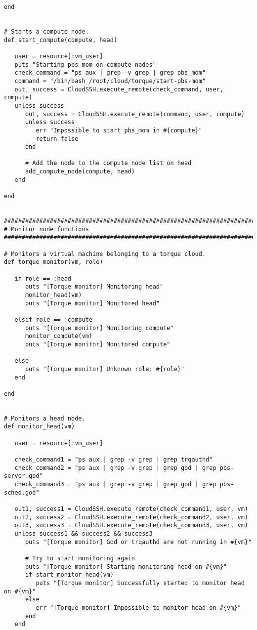 \begin{lstlisting}
end


# Starts a compute node.
def start_compute(compute, head)

   user = resource[:vm_user]
   puts "Starting pbs_mom on compute nodes"
   check_command = "ps aux | grep -v grep | grep pbs_mom"
   command = "/bin/bash /root/cloud/torque/start-pbs-mom"
   out, success = CloudSSH.execute_remote(check_command, user, compute)
   unless success
      out, success = CloudSSH.execute_remote(command, user, compute)
      unless success
         err "Impossible to start pbs_mom in #{compute}"
         return false
      end
      
      # Add the node to the compute node list on head
      add_compute_node(compute, head)
   end

end


################################################################################
# Monitor node functions
################################################################################

# Monitors a virtual machine belonging to a torque cloud.
def torque_monitor(vm, role)

   if role == :head
      puts "[Torque monitor] Monitoring head"
      monitor_head(vm)
      puts "[Torque monitor] Monitored head"

   elsif role == :compute
      puts "[Torque monitor] Monitoring compute"
      monitor_compute(vm)
      puts "[Torque monitor] Monitored compute"

   else
      puts "[Torque monitor] Unknown role: #{role}"
   end
   
end


# Monitors a head node.
def monitor_head(vm)

   user = resource[:vm_user]

   check_command1 = "ps aux | grep -v grep | grep trqauthd"
   check_command2 = "ps aux | grep -v grep | grep god | grep pbs-server.god"
   check_command3 = "ps aux | grep -v grep | grep god | grep pbs-sched.god"
   
   out1, success1 = CloudSSH.execute_remote(check_command1, user, vm)
   out2, success2 = CloudSSH.execute_remote(check_command2, user, vm)
   out3, success3 = CloudSSH.execute_remote(check_command3, user, vm)
   unless success1 && success2 && success3
      puts "[Torque monitor] God or trqauthd are not running in #{vm}"
      
      # Try to start monitoring again
      puts "[Torque monitor] Starting monitoring head on #{vm}"
      if start_monitor_head(vm)
         puts "[Torque monitor] Successfully started to monitor head on #{vm}"
      else
         err "[Torque monitor] Impossible to monitor head on #{vm}"
      end
   end
   

\end{lstlisting}
